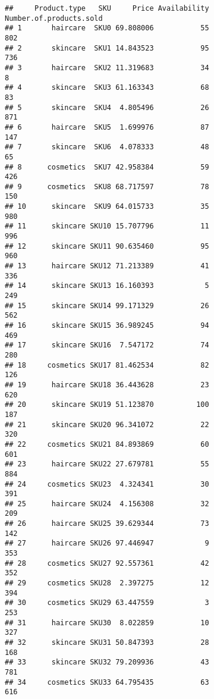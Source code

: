 \documentclass[
]{article}
\begin{document}
\begin{verbatim}
##     Product.type   SKU     Price Availability Number.of.products.sold
## 1       haircare  SKU0 69.808006           55                     802
## 2       skincare  SKU1 14.843523           95                     736
## 3       haircare  SKU2 11.319683           34                       8
## 4       skincare  SKU3 61.163343           68                      83
## 5       skincare  SKU4  4.805496           26                     871
## 6       haircare  SKU5  1.699976           87                     147
## 7       skincare  SKU6  4.078333           48                      65
## 8      cosmetics  SKU7 42.958384           59                     426
## 9      cosmetics  SKU8 68.717597           78                     150
## 10      skincare  SKU9 64.015733           35                     980
## 11      skincare SKU10 15.707796           11                     996
## 12      skincare SKU11 90.635460           95                     960
## 13      haircare SKU12 71.213389           41                     336
## 14      skincare SKU13 16.160393            5                     249
## 15      skincare SKU14 99.171329           26                     562
## 16      skincare SKU15 36.989245           94                     469
## 17      skincare SKU16  7.547172           74                     280
## 18     cosmetics SKU17 81.462534           82                     126
## 19      haircare SKU18 36.443628           23                     620
## 20      skincare SKU19 51.123870          100                     187
## 21      skincare SKU20 96.341072           22                     320
## 22     cosmetics SKU21 84.893869           60                     601
## 23      haircare SKU22 27.679781           55                     884
## 24     cosmetics SKU23  4.324341           30                     391
## 25      haircare SKU24  4.156308           32                     209
## 26      haircare SKU25 39.629344           73                     142
## 27      haircare SKU26 97.446947            9                     353
## 28     cosmetics SKU27 92.557361           42                     352
## 29     cosmetics SKU28  2.397275           12                     394
## 30     cosmetics SKU29 63.447559            3                     253
## 31      haircare SKU30  8.022859           10                     327
## 32      skincare SKU31 50.847393           28                     168
## 33      skincare SKU32 79.209936           43                     781
## 34     cosmetics SKU33 64.795435           63                     616

\end{verbatim}
\end{document}
